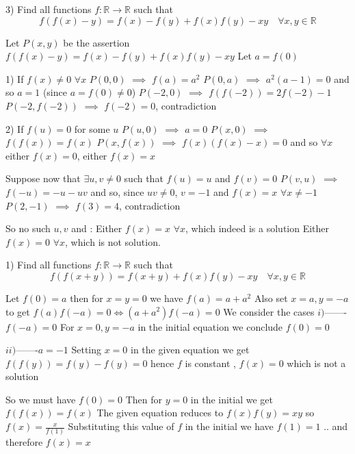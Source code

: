 \begin{solution}
	\begin{tcolorbox}3) Find all functions $f:\mathbb{R}\to\mathbb{R}$ such that
\[f(f(x)-y)=f(x)-f(y)+f(x)f(y)-xy  \quad \forall x,y\in\mathbb{R}\]\end{tcolorbox}
Let $P(x,y)$ be the assertion $f(f(x)-y)=f(x)-f(y)+f(x)f(y)-xy$
Let $a=f(0)$

1) If $f(x)\ne 0$ $\forall x$
$P(0,0)$ $\implies$ $f(a)=a^2$
$P(0,a)$ $\implies$ $a^2(a-1)=0$ and so $a=1$ (since $a=f(0)\ne 0$)
$P(-2,0)$ $\implies$ $f(f(-2))=2f(-2)-1$
$P(-2,f(-2))$ $\implies$ $f(-2)=0$, contradiction

2) If $f(u)=0$ for some $u$
$P(u,0)$ $\implies$ $a=0$
$P(x,0)$ $\implies$ $f(f(x))=f(x)$
$P(x,f(x))$ $\implies$ $f(x)(f(x)-x)=0$ and so $\forall x$ either $f(x)=0$, either $f(x)=x$

Suppose now that $\exists u,v\ne 0$ such that $f(u)=u$ and $f(v)=0$
$P(v,u)$ $\implies$ $f(-u)=-u-uv$ and so, since $uv\ne 0$, $v=-1$ and $f(x)=x$ $\forall x\ne -1$
$P(2,-1)$ $\implies$ $f(3)=4$, contradiction

So no such $u,v$ and  :
Either $\boxed{f(x)=x}$ $\forall x$, which indeed is a solution
Either $f(x)=0$ $\forall x$, which is not  solution.
\end{solution}



\begin{solution}
	\begin{tcolorbox}1) Find all  functions $f:\mathbb{R}\to\mathbb{R}$ such that
\[f(f(x+y))=f(x+y)+f(x)f(y)-xy  \quad \forall x,y\in\mathbb{R}\]

\end{tcolorbox}
Let $f(0)=a$ then for $x=y=0$ we have $f(a)=a+a^{2}$
Also set $x=a,y=-a$ to get $f(a)f(-a)=0\Leftrightarrow (a+a^{2})f(-a)=0$
We consider the cases
$i)$------- $f(-a)=0$
For $x=0,y=-a$ in the initial equation we conclude $f(0)=0$
 
$ii)$-------$a=-1$
Setting  $x=0$ in the given equation we get $f(f(y))=f(y)-f(y)=0$ hence $f$ is constant , $f(x)=0$ which is not a solution 

So we must have $f(0)=0$
Then for $y=0$ in the initial we get $f(f(x))=f(x)$
The given equation reduces to  $f(x)f(y)=xy$ so  $f(x)=\frac{x}{f(1)}$
Substituting this value of $f$ in the initial we have $f(1)=1$ .. and therefore $f(x)=x$
\end{solution}



